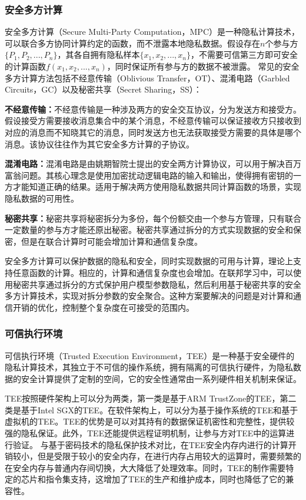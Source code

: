\subsubsection{安全多方计算}
安全多方计算（Secure Multi-Party Computation，MPC）是一种隐私计算技术，可以联合多方协同计算约定的函数，而不泄露本地隐私数据。假设存在$n$个参与方$\{P_1, P_2,...,P_n\}$，其各自拥有隐私样本$\{x_1,x_2,...,x_n\}$，不需要可信第三方即可安全的计算函数$f(x_1,x_2,...,x_n)$，同时保证所有参与方的数据不被泄露。
常见的安全多方计算方法包括不经意传输（Oblivious Transfer，OT）、混淆电路（Garbled Circuits，GC）以及秘密共享（Secret Sharing，SS）：
\begin{compactitem}
	\item \textbf{不经意传输：}不经意传输\cite{rabin1981how}是一种涉及两方的安全交互协议，分为发送方和接受方。假设接受方需要接收消息集合中的某个消息，不经意传输可以保证接收方只接收到对应的消息而不知晓其它的消息，同时发送方也无法获取接受方需要的具体是哪个消息。该协议往往作为其它安全多方计算的子协议。
	\item \textbf{混淆电路：}混淆电路\cite{yao1986how}是由姚期智院士提出的安全两方计算协议，可以用于解决百万富翁问题。其核心理念是使用加密扰动逻辑电路的输入和输出，使得拥有密钥的一方才能知道正确的结果。适用于解决两方使用隐私数据共同计算函数的场景，实现隐私数据的可用性。
	\item \textbf{秘密共享：}秘密共享\cite{shamir1979share}将秘密拆分为多份，每个份额交由一个参与方管理，只有联合一定数量的参与方才能还原出秘密。秘密共享通过拆分的方式实现数据的安全和保密，但是在联合计算时可能会增加计算和通信复杂度。
\end{compactitem}

安全多方计算可以保护数据的隐私和安全，同时实现数据的可用与计算，理论上支持任意函数的计算。相应的，计算和通信复杂度也会增加。在联邦学习中，可以使用秘密共享通过拆分的方式保护用户模型参数隐私，然后利用基于秘密共享的安全多方计算技术，实现对拆分参数的安全聚合。这种方案要解决的问题是对计算和通信开销的优化，控制整个复杂度在可接受的范围内。

\subsubsection{可信执行环境}
可信执行环境（Trusted Execution Environment，TEE）\cite{costan2016intel}是一种基于安全硬件的隐私计算技术，其独立于不可信的操作系统，拥有隔离的可信执行硬件，为隐私数据的安全计算提供了定制的空间，它的安全性通常由一系列硬件相关机制来保证。

TEE按照硬件架构上可以分为两类，第一类是基于ARM TrustZone的TEE\cite{pinto2019demystifying}，第二类是基于Intel SGX的TEE\cite{costan2016intel}。在软件架构上，可以分为基于操作系统的TEE和基于虚拟机的TEE。TEE的优势是可以对其持有的数据保证机密性和完整性，提供较强的隐私保证。此外，TEE还能提供远程证明机制，让参与方对TEE中的运算进行验证。
与基于密码技术的隐私保护技术对比，在TEE安全内存内进行的计算开销较小，但是受限于较小的安全内存，在进行内存占用较大的运算时，需要频繁的在安全内存与普通内存间切换，大大降低了处理效率。同时，TEE的制作需要特定的芯片和指令集支持，这增加了TEE的生产和维护成本，同时也降低了它的兼容性。

